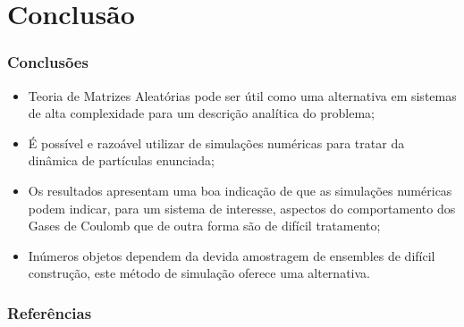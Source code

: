 \begin{frame}
\end{frame}


\section{Conclusão}

\begin{frame}
	\frametitle{Conclusões}
	
	\begin{itemize}
		\item<1> Teoria de Matrizes Aleatórias pode ser útil como uma alternativa em sistemas de alta complexidade para um descrição analítica do problema;
		\item<2> É possível e razoável utilizar de simulações numéricas para tratar da dinâmica de partículas enunciada;
		\item<3>  Os resultados apresentam uma boa indicação de que as simulações numéricas podem indicar, para um sistema de interesse, aspectos do comportamento dos Gases de Coulomb que de outra forma são de difícil tratamento;
		\item<4> Inúmeros objetos dependem da devida amostragem de ensembles de difícil construção, este método de simulação oferece uma alternativa.
	\end{itemize}
\end{frame}

\begin{frame}[allowframebreaks]
	\frametitle{Referências}
	
\end{frame}

